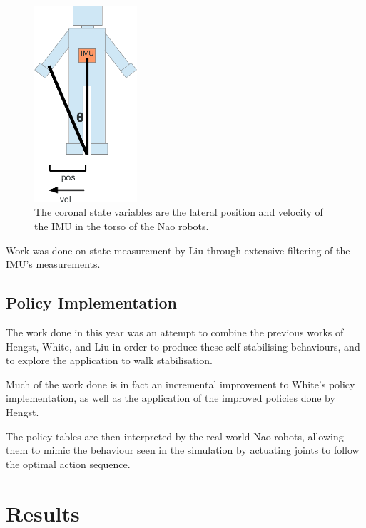 \begin{figure}[h]
\centering
\includegraphics[width=1.5in]{img/lean_trig.png}
\caption{The coronal state variables are the lateral position and velocity of the IMU in the torso of the Nao robots.}
\label{fig:triangle}
\end{figure}

Work was done on state measurement by Liu\cite{liu} through extensive filtering of the IMU's measurements.

\subsection{Policy Implementation}

The work done in this year was an attempt to combine the previous works of Hengst, White, and Liu in order to produce these self-stabilising behaviours, and to explore the application to walk stabilisation.


Much of the work done is in fact an incremental improvement to White's policy implementation, as well as the application of the improved policies done by Hengst.


The policy tables are then interpreted by the real-world Nao robots, allowing them to mimic the behaviour seen in the simulation by actuating joints to follow the optimal action sequence.

\section{Results}

